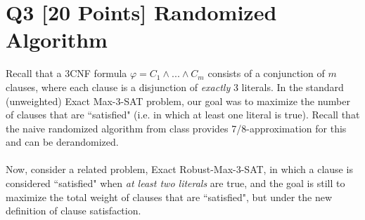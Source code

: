 \documentclass[10pt]{article}
\begin{document}
\section*{Q3 [20 Points] Randomized Algorithm}
Recall that a 3CNF formula $\varphi = C_1 \land ... \land C_m$ consists of a conjunction of $m$ clauses, where each clause is a disjunction of \textit{exactly} 3 literals. In the standard (unweighted) Exact Max-3-SAT problem, our goal was to maximize the number of clauses that are ``satisfied" (i.e. in which at least one literal is true). Recall that the naive randomized algorithm from class provides 7/8-approximation for this and can be derandomized.\\
\\
Now, consider a related problem, Exact Robust-Max-3-SAT, in which a clause is considered ``satisfied" when \textit{at least two literals} are true, and the goal is still to maximize the total weight of clauses that are ``satisfied", but under the new definition of clause satisfaction.
\end{document}
